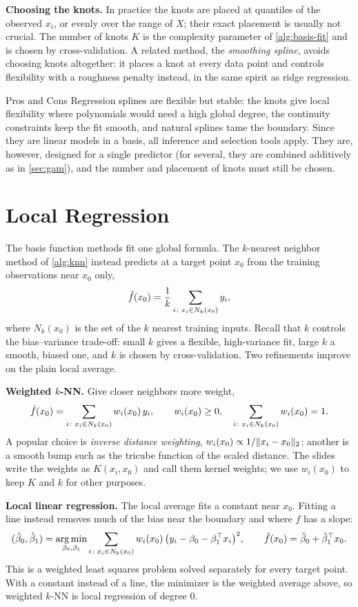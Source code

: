 \smallskip\noindent\textbf{Choosing the knots.} In practice the knots are placed at quantiles of the observed $x_i$, or evenly over the range of $X$; their exact placement is usually not crucial. The number of knots $K$ is the complexity parameter of \cref{alg:basis-fit} and is chosen by cross-validation. A related method, the \emph{smoothing spline}, avoids choosing knots altogether: it places a knot at every data point and controls flexibility with a roughness penalty instead, in the same spirit as ridge regression.

\begin{notebox}{Pros and Cons}
Regression splines are flexible but stable: the knots give local flexibility where polynomials would need a high global degree, the continuity constraints keep the fit smooth, and natural splines tame the boundary. Since they are linear models in a basis, all inference and selection tools apply. They are, however, designed for a single predictor (for several, they are combined additively as in \cref{sec:gam}), and the number and placement of knots must still be chosen.
\end{notebox}

\section{Local Regression}\label{sec:local-regression}

The basis function methods fit one global formula. The $k$-nearest neighbor method of \cref{alg:knn} instead predicts at a target point $x_0$ from the training observations near $x_0$ only,
\[
\hat f(x_0)=\frac1k\sum_{i\colon x_i\in N_k(x_0)}y_i ,
\]
where $N_k(x_0)$ is the set of the $k$ nearest training inputs. Recall that $k$ controls the bias--variance trade-off: small $k$ gives a flexible, high-variance fit, large $k$ a smooth, biased one, and $k$ is chosen by cross-validation. Two refinements improve on the plain local average.

\smallskip\noindent\textbf{Weighted $k$-NN.} Give closer neighbors more weight,
\[
\hat f(x_0)=\sum_{i\colon x_i\in N_k(x_0)}w_i(x_0)\,y_i,\qquad w_i(x_0)\ge0,\quad \sum_{i\colon x_i\in N_k(x_0)}w_i(x_0)=1 .
\]
A popular choice is \emph{inverse distance weighting}, $w_i(x_0)\propto1/\lVert x_i-x_0\rVert_2$; another is a smooth bump such as the tricube function of the scaled distance. The slides write the weights as $K(x_i,x_0)$ and call them kernel weights; we use $w_i(x_0)$ to keep $K$ and $k$ for other purposes.

\smallskip\noindent\textbf{Local linear regression.} The local average fits a constant near $x_0$. Fitting a line instead removes much of the bias near the boundary and where $f$ has a slope:
\[
(\hat\beta_0,\hat\beta_1)=\operatorname*{arg\,min}_{\beta_0,\beta_1}\sum_{i\colon x_i\in N_k(x_0)}w_i(x_0)\,\big(y_i-\beta_0-\beta_1^{\top} x_i\big)^2,\qquad \hat f(x_0)=\hat\beta_0+\hat\beta_1^{\top} x_0 .
\]
This is a weighted least squares problem solved separately for every target point. With a constant instead of a line, the minimizer is the weighted average above, so weighted $k$-NN is local regression of degree $0$.

